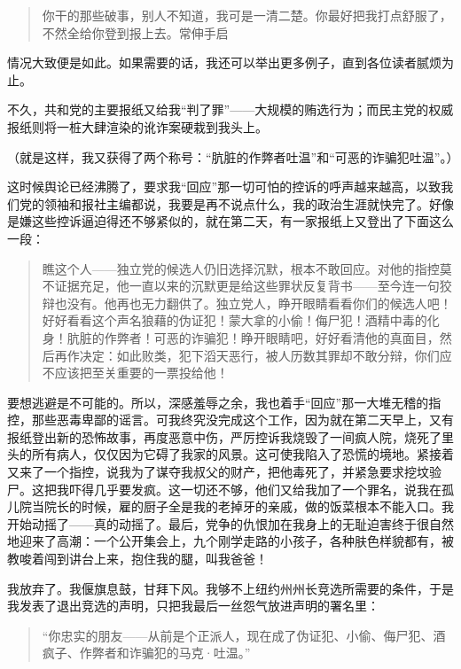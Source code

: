 \documentclass[12pt,UTF-8,openany]{ctexbook}
\begin{document}
\begin{normalsize}
\begin{quotation}
    你干的那些破事，别人不知道，我可是一清二楚。你最好把我打点舒服了，不然全给你登到报上去。常伸手启
    
    \end{quotation}
    
    情况大致便是如此。如果需要的话，我还可以举出更多例子，直到各位读者腻烦为止。
    
    不久，共和党的主要报纸又给我“判了罪”——大规模的贿选行为；而民主党的权威报纸则将一桩大肆渲染的讹诈案硬栽到我头上。
    
    （就是这样，我又获得了两个称号：“肮脏的作弊者吐温”和“可恶的诈骗犯吐温”。）
    
    这时候舆论已经沸腾了，要求我“回应”那一切可怕的控诉的呼声越来越高，以致我们党的领袖和报社主编都说，我要是再不说点什么，我的政治生涯就快完了。好像是嫌这些控诉逼迫得还不够紧似的，就在第二天，有一家报纸上又登出了下面这么一段：
    
    \begin{quotation}
    
    瞧这个人——独立党的候选人仍旧选择沉默，根本不敢回应。对他的指控莫不证据充足，他一直以来的沉默更是给这些罪状反复背书——至今连一句狡辩也没有。他再也无力翻供了。独立党人，睁开眼睛看看你们的候选人吧！好好看看这个声名狼藉的伪证犯！蒙大拿的小偷！侮尸犯！酒精中毒的化身！肮脏的作弊者！可恶的诈骗犯！睁开眼睛吧，好好看清他的真面目，然后再作决定：如此败类，犯下滔天恶行，被人历数其罪却不敢分辩，你们应不应该把至关重要的一票投给他！
    
    \end{quotation}
    
    要想逃避是不可能的。所以，深感羞辱之余，我也着手“回应”那一大堆无稽的指控，那些恶毒卑鄙的谣言。可我终究没完成这个工作，因为就在第二天早上，又有报纸登出新的恐怖故事，再度恶意中伤，严厉控诉我烧毁了一间疯人院，烧死了里头的所有病人，仅仅因为它碍了我家的风景。这可使我陷入了恐慌的境地。紧接着又来了一个指控，说我为了谋夺我叔父的财产，把他毒死了，并紧急要求挖坟验尸。这把我吓得几乎要发疯。这一切还不够，他们又给我加了一个罪名，说我在孤儿院当院长的时候，雇的厨子全是我的老掉牙的亲戚，做的饭菜根本不能入口。我开始动摇了——真的动摇了。最后，党争的仇恨加在我身上的无耻迫害终于很自然地迎来了高潮：一个公开集会上，九个刚学走路的小孩子，各种肤色样貌都有，被教唆着闯到讲台上来，抱住我的腿，叫我爸爸！
    
    我放弃了。我偃旗息鼓，甘拜下风。我够不上纽约州州长竞选所需要的条件，于是我发表了退出竞选的声明，只把我最后一丝怨气放进声明的署名里：
    
    \begin{quotation}
    
    “你忠实的朋友——从前是个正派人，现在成了伪证犯、小偷、侮尸犯、酒疯子、作弊者和诈骗犯的马克·吐温。”
    
    \end{quotation}
    
\end{normalsize}
\end{document}
